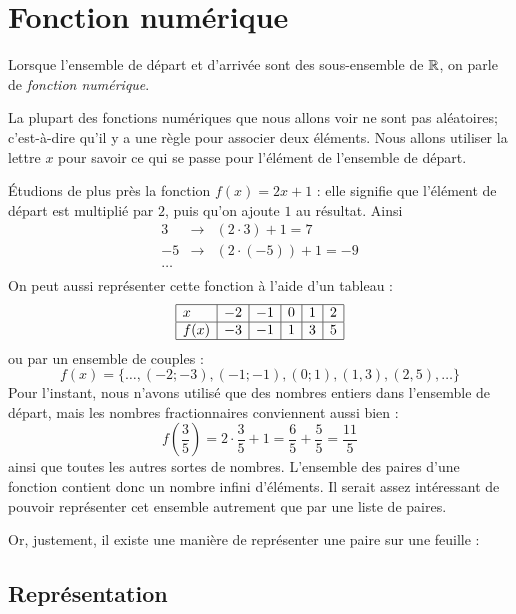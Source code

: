 \section{Fonction numérique}

Lorsque l'ensemble de départ et d'arrivée sont des sous-ensemble de $\mathbb{R}$, on parle de \emph{fonction numérique}.

La plupart des fonctions numériques que nous allons voir ne sont pas aléatoires; c'est-à-dire qu'il y a une règle pour associer deux éléments. Nous allons utiliser la lettre $x$ pour savoir ce qui se passe pour l'élément de l'ensemble de départ.

\begin{exemple}
\'Etudions de plus près la fonction $f(x) = 2x+1$ : elle signifie que l'élément de départ est multiplié par $2$, puis qu'on ajoute $1$ au résultat. Ainsi
$$
\begin{array}{rcl}
3 &\longrightarrow & (2\cdot 3) + 1 = 7\\
-5 &\longrightarrow &  (2 \cdot (-5))+1 = -9 \\
\dots & & \\
\end{array}
$$
On peut aussi représenter cette fonction à l'aide d'un tableau :
$$
\begin{array}{|l|l|l|l|l|l|}
\hline
x & -2 & -1 & 0 & 1 & 2\\
\hline
f(x) & -3 & -1 & 1 & 3 & 5 \\
\hline
\end{array}
$$
ou par un ensemble de couples :
$$
f(x) = \{\dots, (-2;-3), (-1;-1), (0;1), (1,3), (2,5), \dots \}
$$
Pour l'instant, nous n'avons utilisé que des nombres entiers dans l'ensemble de départ, mais les nombres fractionnaires conviennent aussi bien :
$$
f(\frac{3}{5}) = 2\cdot \frac{3}{5} + 1 = \frac{6}{5} + \frac{5}{5} = \frac{11}{5}
$$
ainsi que toutes les autres sortes de nombres. L'ensemble des paires d'une fonction contient donc un nombre infini d'éléments. Il serait assez intéressant de pouvoir représenter cet ensemble autrement que par une liste de paires.

Or, justement, il existe une manière de représenter une paire sur une feuille :

\subsection{Représentation}\label{fct_representation}
 

\end{exemple}
